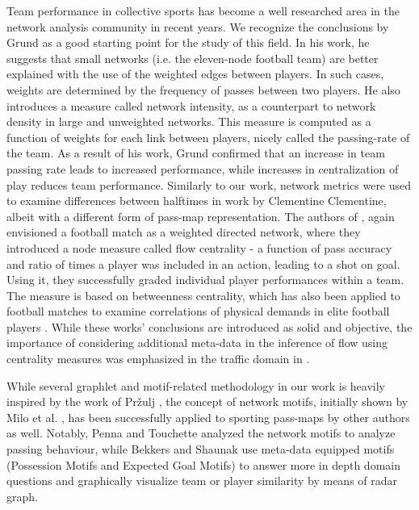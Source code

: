 \documentclass[9pt,twocolumn,twoside]{pnas-report}
\begin{document}
Team performance in collective sports has become a well researched area in the network analysis community in recent years. We recognize the conclusions by Grund \cite{grund} as a good starting point for the study of this field. In his work, he suggests that small networks (i.e. the eleven-node football team) are better explained with the use of the weighted edges between players. In such cases, weights are determined by the frequency of passes between two players. He also introduces a measure called network intensity, as a counterpart to network density in large and unweighted networks. This measure is computed as a function of weights for each link between players, nicely called the passing-rate of the team. As a result of his work, Grund confirmed that an increase in team passing rate leads to increased performance, while increases in centralization of play reduces team performance. Similarly to our work, network metrics were used to examine differences between halftimes in work by Clementine {Clementine}, albeit with a different form of pass-map representation.  The authors of \cite{duch2010quantifying}, again envisioned a football match as a weighted directed network, where they introduced a node measure called flow centrality - a function of pass accuracy and ratio of times a player was included in an action, leading to a shot on goal. Using it, they successfully graded individual player performances within a team. The measure is based on betweenness centrality, which has also been applied to football matches to examine correlations of physical demands in elite football players \cite{castellano2019network}. While these works' conclusions are introduced as solid and objective, the importance of considering additional meta-data in the inference of flow using centrality measures was emphasized in the traffic domain in \cite{kazerani2009can}.

While several graphlet and motif-related methodology in our work is heavily inspired by the work of Pržulj \cite{przulj}, the concept of network motifs, initially shown by Milo et al. \cite{Milo}, has been successfully applied to sporting pass-maps by other authors as well. Notably, Penna and Touchette \cite{penna} analyzed the network motifs to analyze passing behaviour, while Bekkers and Shaunak \cite{Bekkers} use meta-data equipped motifs (Possession Motifs and Expected Goal Motifs) to answer more in depth domain questions and graphically visualize team or player similarity by means of radar graph.
\end{document}
